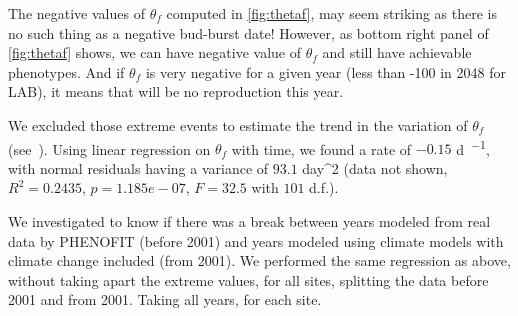 The negative values of $\theta_f$ computed in \autoref{fig:thetaf}, may seem striking as there is no such thing as a negative bud-burst date! However, as bottom right panel of \autoref{fig:thetaf} shows, we can have negative value of $\theta_f$ and still have achievable phenotypes. And if $\theta_f$ is very negative for a given year (less than -100 in 2048 for LAB), it means that will be no reproduction this year.

We excluded those extreme events to estimate the trend in the variation of $\theta_f$ (see~). Using linear regression on $\theta_f$ with time, we found a rate of $-0.15$ \si{\day\per\year}, with normal residuals having a variance of $93.1$ day^2 (data not shown, $R^2=0.2435$, $p=1.185e-07$, $F=32.5$ with $101$ d.f.).

We investigated to know if there was a break between years modeled from real data by \textsc{PHENOFIT} (before 2001) and years modeled using climate models with climate change included (from 2001). We performed the same regression as above, without taking apart the extreme values, for all sites, splitting the data before 2001 and from 2001. Taking all years, for each site.